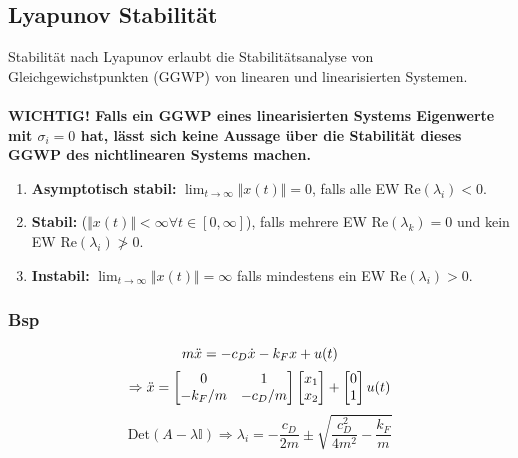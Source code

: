     \subsection{Lyapunov Stabilität}
        Stabilität nach Lyapunov erlaubt die Stabilitätsanalyse von Gleichgewichstpunkten (GGWP) von linearen und linearisierten Systemen.\\\\
        \textbf{WICHTIG! Falls ein GGWP eines linearisierten Systems Eigenwerte mit $\sigma_i=0$ hat, lässt sich keine Aussage über die Stabilität dieses GGWP des nichtlinearen Systems machen.}
        \begin{enumerate}
            \item \textbf{Asymptotisch stabil:} $\displaystyle\lim_{t\to\infty}\Vert x(t)\Vert = 0 $, falls alle EW $\textrm{Re}(\lambda_i)<0$.
            \item \textbf{Stabil:} ($\Vert x(t)\Vert<\infty \forall t \in[0,\infty]$), falls mehrere EW $\textrm{Re}(\lambda_k)=0$ und kein EW $\textrm{Re}(\lambda_i)\ngtr 0$.
            \item \textbf{Instabil:} $\displaystyle\lim_{t\to\infty}\Vert x(t)\Vert = \infty$ falls mindestens ein EW $\textrm{Re}(\lambda_i)>0$.
        \end{enumerate}{}
        \subsubsection{Bsp}
            \[m\Ddot{x}=-c_D\dot{x}-k_Fx+u(t)\]
            \[\Rightarrow \Ddot{x}=
                \begin{bmatrix}
                    0   &   1\\
                    -k_F/m  &   -c_D/m\\
                \end{bmatrix}
                \begin{bmatrix}
                    x_1\\
                    x_2\\
                \end{bmatrix}
                +
                \begin{bmatrix}
                0\\
                1\\
                \end{bmatrix}
                u(t)
            \]
            \[\textrm{Det}(A-\lambda\mathbb{I}) \Rightarrow \lambda_i=-\frac{c_D}{2m}\pm \sqrt{\frac{c_D^2}{4m^2}-\frac{k_F}{m}}\]
            
